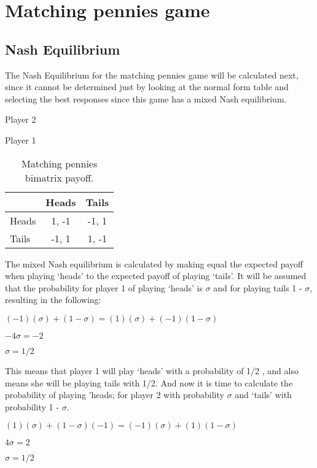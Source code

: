 \section{Matching pennies game}
\label{app:mpnashess}

\subsection{Nash Equilibrium}
The Nash Equilibrium for the matching pennies game will be calculated next, since it cannot be determined just by looking at the normal form table and selecting the best responses since this game has a mixed Nash equilibrium.

\begin{table}[H]
\begin{center}
Player 2

Player 1
\begin{tabular}{|l|c|c|}
\hline
 & Heads & Tails\\ 
\hline
Heads & 1, -1 & -1, 1\\
\hline
Tails & -1, 1 & 1, -1\\
\hline
\end{tabular}

\caption{ Matching pennies bimatrix payoff.}
\label{fig:mpnashmx}	
\end{center}
\end{table}

The mixed Nash equilibrium is calculated by making equal the expected payoff  when playing `heads' to the expected payoff of playing `tails'. It will be assumed that the probability for player 1 of playing `heads' is $\sigma$ and for playing tails 1 - $\sigma$, resulting in the following:
\begin{center}
$(-1)(\sigma) + (1 - \sigma) = (1)(\sigma) + (-1)(1 - \sigma)$
\end{center}
\begin{center}
$-4 \sigma = -2$
\end{center}
\begin{center}
$\sigma = 1/2$
\end{center}
This means that player 1 will play `heads' with a probability of 1/2 , and also means she will be playing tails with 1/2. And now it is time to calculate the probability of playing 'heads; for player 2 with probability $\sigma$ and `tails' with probability 1 - $\sigma$.

\begin{center}
$(1)(\sigma) + (1 - \sigma)(-1) = (-1)(\sigma) + (1)(1 - \sigma)$
\end{center}
\begin{center}
$4 \sigma = 2$
\end{center}
\begin{center}
$\sigma = 1/2$
\end{center}

